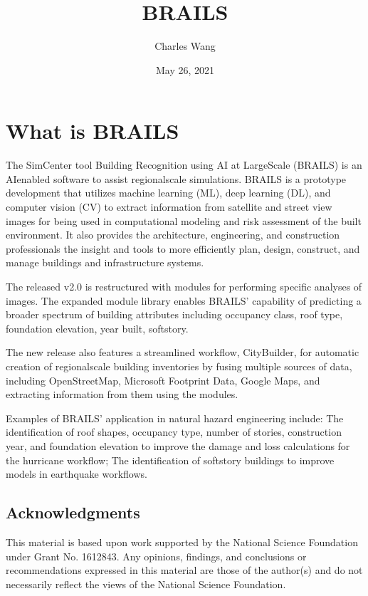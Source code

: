 \documentclass[letterpaper,10pt,english]{sphinxmanual}
\title{BRAILS}
\date{May 26, 2021}
\author{Charles Wang}
\let\sphinxpxdimen\pdfpxdimen\else\newdimen\sphinxpxdimen
\begin{document}
\pagestyle{empty}
\sphinxmaketitle
\pagestyle{plain}
\sphinxtableofcontents
\pagestyle{normal}
\label{\detokenize{index::doc}}


\noindent\sphinxincludegraphics[width=700\sphinxpxdimen]{{brails-demo}.gif}


\chapter{What is BRAILS}
\label{\detokenize{index:what-is-brailsname}}
\sphinxAtStartPar
The SimCenter tool \sphinxhyphen{} Building Recognition using AI at Large\sphinxhyphen{}Scale (BRAILS) is an AI\sphinxhyphen{}enabled software to assist regional\sphinxhyphen{}scale simulations. BRAILS is a prototype development that utilizes machine learning (ML), deep learning (DL), and computer vision (CV) to extract information from satellite and street view images for being used in computational modeling and risk assessment of the built environment. It also provides the architecture, engineering, and construction professionals the insight and tools to more efficiently plan, design, construct, and manage buildings and infrastructure systems.

\sphinxAtStartPar
The released v2.0 is re\sphinxhyphen{}structured with modules for performing specific analyses of images.
The expanded module library enables BRAILS’ capability of predicting a broader spectrum of building attributes including occupancy class, roof type, foundation elevation, year built, soft\sphinxhyphen{}story.

\sphinxAtStartPar
The new release also features a streamlined workflow, CityBuilder, for automatic creation of regional\sphinxhyphen{}scale building inventories by fusing multiple sources of data, including OpenStreetMap, Microsoft Footprint Data, Google Maps, and extracting information from them using the modules.

\sphinxAtStartPar
Examples of BRAILS’ application in natural hazard engineering include:
The identification of roof shapes, occupancy type, number of stories, construction year, and foundation elevation to improve the damage and loss calculations for the hurricane workflow; The identification of soft\sphinxhyphen{}story buildings to improve models in earthquake workflows.


\section{Acknowledgments}
\label{\detokenize{common/user_manual/acknowledgments:acknowledgments}}\label{\detokenize{common/user_manual/acknowledgments:lblacknowledgements}}\label{\detokenize{common/user_manual/acknowledgments::doc}}
\sphinxAtStartPar
This material is based upon work supported by the National Science Foundation under Grant No. 1612843. Any opinions, findings, and conclusions or recommendations expressed in this material are those of the author(s) and do not necessarily reflect the views of the National Science Foundation.
\end{document}
